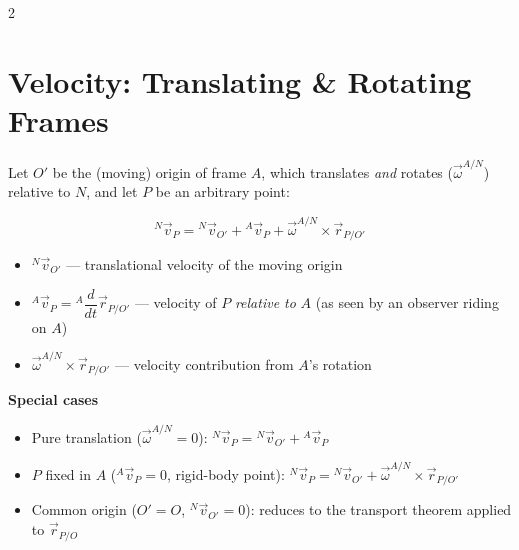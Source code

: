 \documentclass[10pt]{article}
\newcommand{\rate}[2]{{}^{#1}\dfrac{d}{dt}#2}
\begin{document}
\begin{multicols}{2}
\section*{Velocity: Translating \& Rotating Frames}
Let $O'$ be the (moving) origin of frame $A$, which translates \emph{and} rotates ($\vec\omega^{A/N}$) relative to $N$, and let $P$ be an arbitrary point:
\begin{keybox}
\[
    {}^{N}\vec v_P = {}^{N}\vec v_{O'} + {}^{A}\vec v_P + \vec\omega^{A/N}\times\vec r_{P/O'}
\]
\end{keybox}
\begin{itemize}[nosep, leftmargin=1.1em]
    \item ${}^{N}\vec v_{O'}$ --- translational velocity of the moving origin
    \item ${}^{A}\vec v_P = \rate{A}{\vec r_{P/O'}}$ --- velocity of $P$ \emph{relative to} $A$ (as seen by an observer riding on $A$)
    \item $\vec\omega^{A/N}\times\vec r_{P/O'}$ --- velocity contribution from $A$'s rotation
\end{itemize}
\textbf{Special cases}
\begin{itemize}[nosep, leftmargin=1.1em]
    \item Pure translation ($\vec\omega^{A/N}=0$): ${}^{N}\vec v_P = {}^{N}\vec v_{O'} + {}^{A}\vec v_P$
    \item $P$ fixed in $A$ (${}^{A}\vec v_P = 0$, rigid-body point): ${}^{N}\vec v_P = {}^{N}\vec v_{O'} + \vec\omega^{A/N}\times\vec r_{P/O'}$
    \item Common origin ($O'=O$, ${}^{N}\vec v_{O'}=0$): reduces to the transport theorem applied to $\vec r_{P/O}$
\end{itemize}


\end{multicols}
\end{document}
